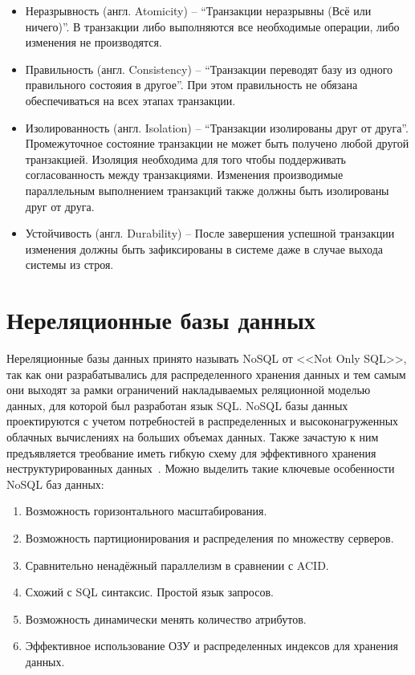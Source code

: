 \clearpage

\begin{itemize}[label=---]
    \item Неразрывность (англ. Atomicity) -- ``Транзакции неразрывны (Всё или ничего)''.
    В транзакции либо выполняются все необходимые операции,
    либо изменения не производятся.

    \item Правильность (англ. Consistency) -- ``Транзакции переводят базу из одного правильного состояия в другое''.
    При этом правильность не обязана обеспечиваться на всех этапах транзакции. 
    
    \item Изолированность (англ. Isolation) -- ``Транзакции изолированы друг от друга''. 
    Промежуточное состояние транзакции не может быть получено любой другой транзакцией.
    Изоляция необходима для того чтобы поддерживать согласованность между транзакциями.
    Изменения производимые параллельным выполнением транзакций также должны быть изолированы друг от друга.

    \item Устойчивость (англ. Durability) -- После завершения успешной транзакции изменения должны быть зафиксированы в системе
    даже в случае выхода системы из строя.
\end{itemize}

\clearpage


\clearpage
\clearpage
\clearpage
\section{Нереляционные базы данных}
Нереляционные базы данных принято называть NoSQL от <<Not Only SQL>>,
так как они разрабатывались для распределенного хранения данных
и тем самым они выходят за рамки ограничений накладываемых реляционной моделью данных,
для которой был разработан язык SQL.
NoSQL базы данных проектируются с учетом потребностей в распределенных
и высоконагруженных облачных вычислениях на больших объемах данных.
Также зачастую к ним предъявляется треобвание иметь гибкую схему 
для эффективного хранения неструктурированных данных~\cite{nosqlusage}.  
Можно выделить такие ключевые особенности NoSQL баз данных:
\begin{enumerate}
    \item Возможность горизонтального масштабирования.
    \item Возможность партиционирования и распределения по множеству серверов.
    \item Сравнительно ненадёжный параллелизм в сравнении с ACID.
    \item Схожий с SQL синтаксис. Простой язык запросов.
    \item Возможность динамически менять количество атрибутов.
    \item Эффективное использование ОЗУ и распределенных индексов для хранения данных.
\end{enumerate}

